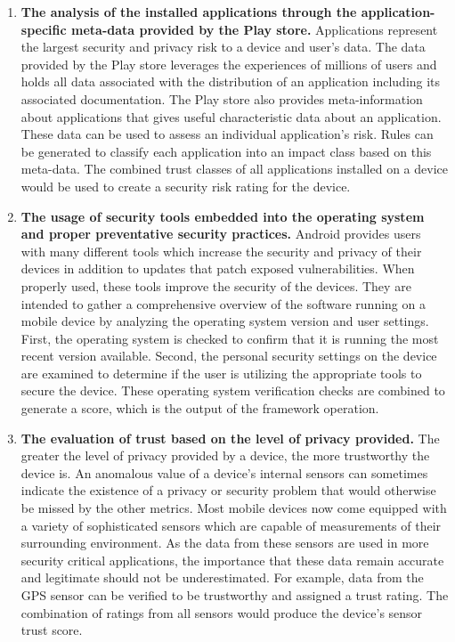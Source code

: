 \begin{enumerate}
\item {\bf The analysis of the installed applications through the application-specific meta-data provided by the Play store.} Applications represent the largest security and privacy risk to a device and user's data. The data provided by the Play store leverages the experiences of millions of users and holds all data associated with the distribution of an application including its associated documentation. The Play store also provides meta-information about applications that gives useful characteristic data about an application. These data can be used to assess an individual application's risk. Rules can be generated to classify each application into an impact class based on this meta-data. The combined trust classes of all applications installed on a device would be used to create a security risk rating for the device.

\item {\bf The usage of security tools embedded into the operating system and proper preventative security practices.}
Android provides users with many different tools which increase the security and privacy of their devices in addition to updates 
that patch exposed vulnerabilities.  When properly used, these tools improve the security of the devices. They are 
intended to gather a 
comprehensive overview of the software running on a mobile device by analyzing the operating system version and user settings. 
First, the operating system is checked to confirm that it is running the most recent version available. Second, the personal 
security settings on the device are examined to determine if the user is utilizing the appropriate tools to secure the device. 
These operating system verification checks are combined to generate a score, which is the output of the framework operation.

\item {\bf The evaluation of trust  based on the level of privacy provided.}  The greater the level of privacy provided by a device, the more
trustworthy the device is.
An anomalous value of a device's internal sensors can sometimes indicate the existence of a privacy or security problem 
that would otherwise be missed by the other metrics. Most mobile devices now come equipped with a variety of sophisticated 
 sensors which are capable of  measurements of their surrounding environment. 
As the data from these sensors are used in more security critical applications, the importance that these data remain accurate and legitimate should not be underestimated. For example, data from the GPS sensor can be verified to be trustworthy and assigned a trust rating. The combination of ratings from all sensors would produce the device's sensor trust score.
\end{enumerate}

